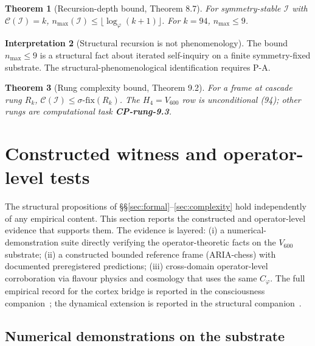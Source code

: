 \documentclass[11pt]{article}
\theoremstyle{plain}
\newtheorem{theorem}{Theorem}[section]
\theoremstyle{definition}
\newtheorem{interpretation}[theorem]{Interpretation}
\theoremstyle{remark}
\newcommand{\Ical}{\mathcal{I}}
\newcommand{\Ccal}{\mathcal{C}}
\newcommand{\Cph}{C_\varphi}
\begin{document}
\begin{theorem}[Recursion-depth bound, \citet{AlgebraicExistence} Theorem 8.7]\label{thm:recursion-depth}
For symmetry-stable $\Ical$ with $\Ccal(\Ical) = k$, $n_{\max}(\Ical) \leq \lfloor \log_\varphi(k + 1) \rfloor$. For $k = 94$, $n_{\max} \leq 9$.
\end{theorem}

\begin{interpretation}[Structural recursion is not phenomenology]\label{int:recursion-not-phenomenology}
The bound $n_{\max} \leq 9$ is a structural fact about iterated self-inquiry on a finite symmetry-fixed substrate. The structural-phenomenological identification requires P-A.
\end{interpretation}

\begin{theorem}[Rung complexity bound, \citet{AlgebraicExistence} Theorem 9.2]\label{thm:rung-complexity}
For a frame at cascade rung $R_k$, $\Ccal(\Ical) \leq \sigma\text{-fix}(R_k)$. The $H_4 = V_{600}$ row is unconditional (94); other rungs are computational task \textbf{CP-rung-9.3}.
\end{theorem}


\section{Constructed witness and operator-level tests}\label{sec:aria}

The structural propositions of \S\S\ref{sec:formal}--\ref{sec:complexity} hold independently of any empirical content. This section reports the constructed and operator-level evidence that supports them. The evidence is layered: (i) a numerical-demonstration suite directly verifying the operator-theoretic facts on the $V_{600}$ substrate; (ii) a constructed bounded reference frame (ARIA-chess) with documented preregistered predictions; (iii) cross-domain operator-level corroboration via flavour physics and cosmology that uses the same $\Cph$. The full empirical record for the cortex bridge is reported in the consciousness companion~\citep{SmartProcessingToPOV}; the dynamical extension is reported in the structural companion~\citep{SmartCosmicClosure}.

\subsection{Numerical demonstrations on the substrate}\label{sec:numerical-demos}
\end{document}
